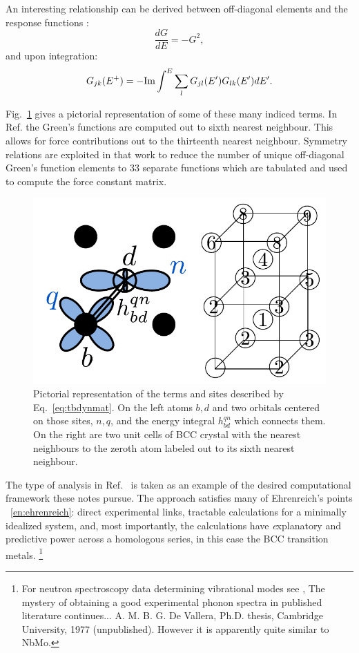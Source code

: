 An interesting relationship can be derived between off-diagonal elements
and the response functions \cite{terakura82, sutton88}:
%
\begin{equation}
\frac{dG}{dE}=-G^{2},
\end{equation}
%
and upon integration:
%
\begin{equation}
G_{jk}(E^{+}) = -{\rm Im}\int^{E}\sum_{l}G_{jl}(E')G_{lk}(E')dE'.
\end{equation}
%

Fig.~\ref{fig:tbresponse} gives a pictorial representation of some of these many indiced terms. In 
Ref.\cite{finnis84} the Green's functions are computed out to sixth nearest neighbour. This allows
for force contributions out to the thirteenth nearest neighbour. Symmetry relations are exploited 
in that work to reduce the number of unique off-diagonal Green's function elements to 
33 separate functions which are tabulated and used to compute the force constant matrix. 
%
\begin{figure}
\begin{center}
\includegraphics[scale=0.8]{./invariance/tbresponse.pdf}
\caption{Pictorial representation of the terms and sites 
described by Eq.~\ref{eq:tbdynmat}. On the left atoms $b,d$ 
and two orbitals centered on those sites, $n, q$, and the energy
integral $h_{bd}^{qn}$ which connects them. On the right are two unit cells
of BCC crystal with the nearest neighbours to the zeroth atom 
labeled out to its sixth nearest neighbour.\label{fig:tbresponse}}
\end{center}
\end{figure}

The type of analysis in Ref.~\cite{finnis84} is taken as an example
of the desired computational framework these notes pursue. 
The approach satisfies many of Ehrenreich's points ~\ref{en:ehrenreich}: 
direct experimental links, tractable calculations 
for a minimally idealized system, and, most importantly, 
the calculations have {\emph explanatory and predictive power 
across a homologous series}, in this case the BCC transition metals.
\footnote{For neutron spectroscopy data determining vibrational modes 
see \cite{powell68, colella70, shaw71}, The mystery of obtaining a 
good experimental phonon spectra in published literature continues... 
A. M. B. G. De Vallera, Ph.D. thesis, Cambridge University, 1977 (unpublished).
However it is apparently quite similar to NbMo\cite{powerll68}.}

